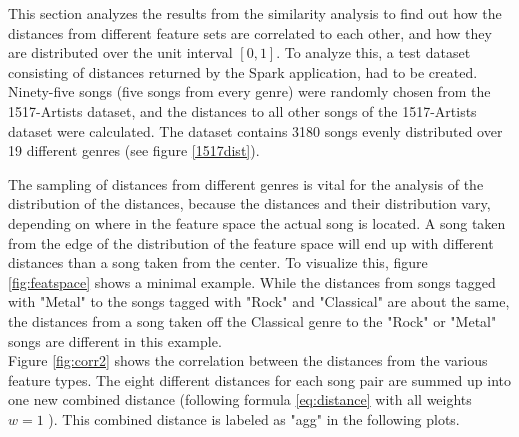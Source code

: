 This section analyzes the results from the similarity analysis to find out how the distances from different feature sets are correlated to each other, and how they are distributed over the unit interval $[0,1]$.
\noindent To analyze this, a test dataset consisting of distances returned by the Spark application, had to be created. Ninety-five songs (five songs from every genre) were randomly chosen from the 1517-Artists dataset, and the distances to all other songs of the 1517-Artists dataset were calculated. The dataset contains 3180 songs evenly distributed over 19 different genres (see figure \ref{1517dist}).
\begin{figure}[htbp]
	\centering
\end{figure}%
\FloatBarrier

\noindent The sampling of distances from different genres is vital for the analysis of the distribution of the distances, because the distances and their distribution vary, depending on where in the feature space the actual song is located. 
\noindent A song taken from the edge of the distribution of the feature space will end up with different distances than a song taken from the center. To visualize this, figure \ref{fig:featspace} shows a minimal example. While the distances from songs tagged with "Metal" to the songs tagged with "Rock" and "Classical" are about the same, the distances from a song taken off the Classical genre to the "Rock" or "Metal" songs are different in this example.\\ 
\noindent Figure \ref{fig:corr2} shows the correlation between the distances from the various feature types. The eight different distances for each song pair are summed up into one new combined distance (following formula \ref{eq:distance} with all weights $w = 1$ ). This combined distance is labeled as "agg" in the following plots.

